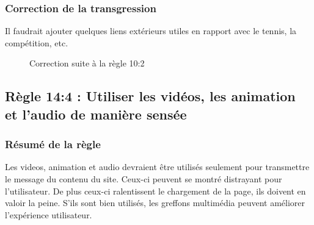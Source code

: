 \documentclass{article}[12pt]
\begin{document}
    \subsubsection*{Correction de la transgression}
    Il faudrait ajouter quelques liens extérieurs utiles en rapport avec le tennis, la compétition, etc.
        \begin{figure}[H]
        	\centering
        	\caption{Correction suite à la règle 10:2}
        \end{figure}
   \newpage
 
   \subsection{Règle 14:4 : Utiliser les vidéos, les animation et l'audio de manière sensée}
   \label{animation}
    	    \subsubsection*{Résumé de la règle}
	    	Les videos, animation et audio devraient être utilisés seulement pour transmettre le message du contenu du site. Ceux-ci peuvent se montré distrayant pour l'utilisateur. De plus ceux-ci ralentissent le chargement de la page, ils doivent en valoir la peine. S'ils sont bien  utilisés, les greffons multimédia peuvent améliorer l'expérience utilisateur.
    	    
\end{document}
